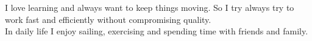 \documentclass[a4paper]{twentysecondcv} %
\begin{document}





{\hspace{1em}
I love learning and always want to keep things moving. So I try always try to work fast and efficiently without compromising quality.\\

In daily life I enjoy sailing, exercising and spending time with friends and family.
}


    
    

\makeprofile %

\end{document}
